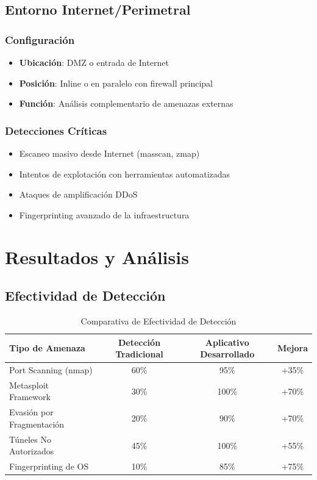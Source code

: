 \documentclass[12pt,a4paper]{article}
\begin{document}
\subsection{Entorno Internet/Perimetral}

\subsubsection{Configuración}
\begin{itemize}
    \item \textbf{Ubicación}: DMZ o entrada de Internet
    \item \textbf{Posición}: Inline o en paralelo con firewall principal
    \item \textbf{Función}: Análisis complementario de amenazas externas
\end{itemize}

\subsubsection{Detecciones Críticas}
\begin{itemize}
    \item Escaneo masivo desde Internet (masscan, zmap)
    \item Intentos de explotación con herramientas automatizadas
    \item Ataques de amplificación DDoS
    \item Fingerprinting avanzado de la infraestructura
\end{itemize}

\section{Resultados y Análisis}

\subsection{Efectividad de Detección}

\begin{table}[H]
\centering
\begin{tabular}{|l|c|c|c|}
\hline
\textbf{Tipo de Amenaza} & \textbf{Detección Tradicional} & \textbf{Aplicativo Desarrollado} & \textbf{Mejora} \\
\hline
Port Scanning (nmap) & 60\% & 95\% & +35\% \\
Metasploit Framework & 30\% & 100\% & +70\% \\
Evasión por Fragmentación & 20\% & 90\% & +70\% \\
Túneles No Autorizados & 45\% & 100\% & +55\% \\
Fingerprinting de OS & 10\% & 85\% & +75\% \\
\hline
\end{tabular}
\caption{Comparativa de Efectividad de Detección}
\end{table}
\end{document}
